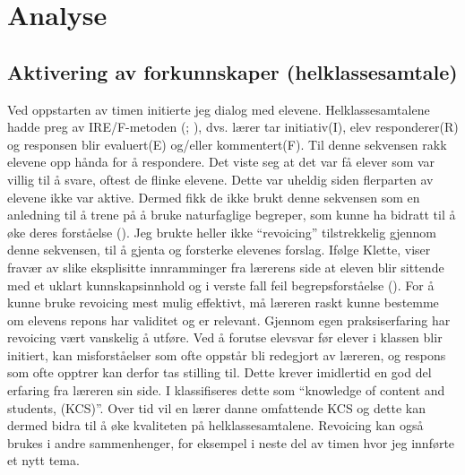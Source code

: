 \documentclass[main.tex]{subfiles}
\begin{document}
\section*{Analyse}
\label{sec:2}

\subsection*{Aktivering av forkunnskaper (helklassesamtale)}
Ved oppstarten av timen initierte jeg dialog med elevene. Helklassesamtalene hadde preg av
IRE/F-metoden (; ), dvs. lærer tar initiativ(I), elev 
responderer(R) og responsen blir evaluert(E) og/eller kommentert(F). Til denne sekvensen rakk 
elevene opp hånda for å respondere. Det viste seg at det var få elever som var villig til å svare, 
oftest de flinke elevene. Dette var uheldig siden flerparten av elevene ikke var aktive. Dermed 
fikk de ikke brukt denne sekvensen som en anledning til å trene på å bruke naturfaglige begreper, 
som kunne ha bidratt til å øke deres forståelse ().
\newline
\newline
Jeg brukte heller ikke ``revoicing'' tilstrekkelig gjennom denne sekvensen, til å gjenta og 
forsterke elevenes forslag. Ifølge Klette, viser fravær av slike eksplisitte 
innramminger fra lærerens side at eleven blir sittende med et uklart kunnskapsinnhold og i 
verste fall feil begrepsforståelse (). For å kunne bruke revoicing 
mest mulig effektivt, må læreren raskt kunne bestemme om elevens repons har validitet 
og er relevant. Gjennom egen praksiserfaring har revoicing vært vanskelig å utføre.
Ved å forutse elevsvar før elever i klassen blir initiert, kan misforståelser som ofte oppstår bli 
redegjort av læreren, og respons som ofte opptrer kan derfor tas stilling til. Dette krever imidlertid 
en god del erfaring fra læreren sin side. I  klassifiseres dette som 
``knowledge of content and students, (KCS)''. Over tid vil en lærer danne omfattende KCS og
dette kan dermed bidra til å øke kvaliteten på helklassesamtalene. Revoicing kan også brukes
i andre sammenhenger, for eksempel i neste del av timen hvor jeg innførte et nytt tema. 
\end{document}
